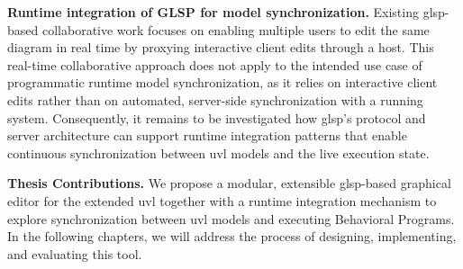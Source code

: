 \textbf{Runtime integration of GLSP for model synchronization.}
Existing \gls{glsp}-based collaborative work focuses on enabling multiple users to edit the same diagram in real time by proxying interactive client edits through a host.
This real-time collaborative approach does not apply to the intended use case of programmatic runtime model synchronization, as it relies on interactive client edits rather than on automated, server-side synchronization with a running system.
Consequently, it remains to be investigated how \gls{glsp}'s protocol and server architecture can support runtime integration patterns that enable continuous synchronization between \gls{uvl} models and the live execution state.

\textbf{Thesis Contributions.}
We propose a modular, extensible \gls{glsp}-based graphical editor for the extended \gls{uvl} together with a runtime integration mechanism to explore synchronization between \gls{uvl} models and executing Behavioral Programs.
In the following chapters, we will address the process of designing, implementing, and evaluating this tool.